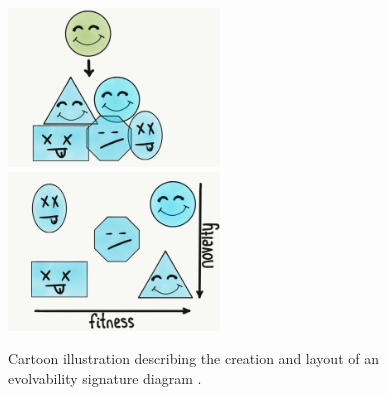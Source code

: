 \begin{figure}
  \includegraphics[width=0.5\textwidth]{img/evol_sig_gen}
  \includegraphics[width=0.5\textwidth]{img/evol_sig_read}
  \captionsetup{singlelinecheck=off,justification=raggedright}
  \caption{Cartoon illustration describing the creation and layout of an evolvability signature diagram \cite{Tarapore2015EvolvabilityBenchmarks}.}
  \label{fig:reading_evolvability_signature}
\end{figure}